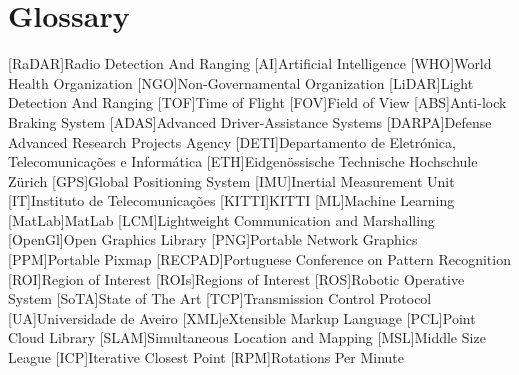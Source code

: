 \chapter{Glossary}

\footnotesize
\SingleSpacing

\begin{multicols}{2} 
\begin{acronym}[AAAAAA]
	[RaDAR]{Radio Detection And Ranging}
	[AI]{Artificial Intelligence}
	[WHO]{World Health Organization}
	[NGO]{Non-Governamental Organization} 
	[LiDAR]{Light Detection And Ranging}
	[TOF]{Time of Flight} 
	[FOV]{Field of View}
	[ABS]{Anti-lock Braking System}
	[ADAS]{Advanced Driver-Assistance Systems}
	[DARPA]{Defense Advanced Research Projects Agency}
	[DETI]{Departamento de Eletrónica, Telecomunicações e Informática}
	[ETH]{Eidgenössische Technische Hochschule Zürich}
	[GPS]{Global Positioning System}
	[IMU]{Inertial Measurement Unit}
	[IT]{Instituto de Telecomunicações}
	[KITTI]{KITTI}
	[ML]{Machine Learning}
	[MatLab\textsuperscript{\tiny\textregistered}]{MatLab\textsuperscript{\tiny\textregistered}}
	[LCM]{Lightweight Communication and Marshalling}
	[OpenGl]{Open Graphics Library}
	[PNG]{Portable Network Graphics}
	[PPM]{Portable Pixmap}
	[RECPAD]{Portuguese Conference on Pattern Recognition}
	[ROI]{Region of Interest}
	[ROIs]{Regions of Interest}
	[ROS]{Robotic Operative System} 
	[SoTA]{State of The Art}
	[TCP]{Transmission Control Protocol}
	[UA]{Universidade de Aveiro}
	[XML]{eXtensible Markup Language}
	[PCL]{Point Cloud Library}
	[SLAM]{Simultaneous Location and Mapping} 
	[MSL]{Middle Size League}
	[ICP]{Iterative Closest Point}
	[RPM]{Rotations Per Minute}
\end{acronym}
\end{multicols}

